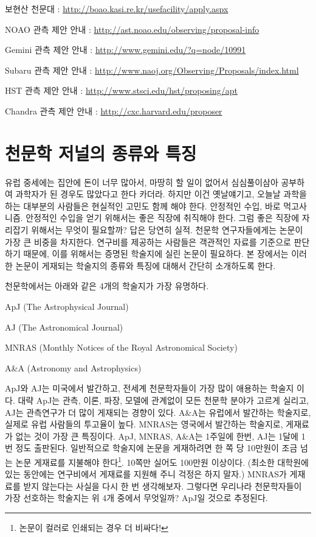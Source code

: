 \begin{packed_item}
\item 보현산 천문대 : \url{http://boao.kasi.re.kr/usefacility/apply.aspx}
\item NOAO 관측 제안 안내 : \url{http://ast.noao.edu/observing/proposal-info}
\item Gemini 관측 제안 안내 : \url{http://www.gemini.edu/?q=node/10991}
\item Subaru 관측 제안 안내 : \url{http://www.naoj.org/Observing/Proposals/index.html}
\item HST 관측 제안 안내 : \url{http://www.stsci.edu/hst/proposing/apt}
\item Chandra 관측 제안 안내 : \url{http://cxc.harvard.edu/proposer}
\end{packed_item}

\section{천문학 저널의 종류와 특징}
유럽 중세에는 집안에 돈이 너무 많아서, 마땅히 할 일이 없어서 심심풀이삼아
공부하여 과학자가 된 경우도 많았다고 한다 카더라. 하지만 이건 옛날얘기고, 오늘날
과학을 하는 대부분의 사람들은 현실적인 고민도 함께 해야 한다. 안정적인 수입, 바로
먹고사니즘. 안정적인 수입을 얻기 위해서는 좋은 직장에 취직해야 한다. 그럼 좋은
직장에 자리잡기 위해서는 무엇이 필요할까? 답은 당연히 실적. 천문학 연구자들에게는
논문이 가장 큰 비중을 차지한다. 연구비를 제공하는 사람들은 객관적인 자료를
기준으로 판단하기 때문에, 이를 위해서는 증명된 학술지에 실린 논문이 필요하다. 본
장에서는 이러한 논문이 게재되는 학술지의 종류와 특징에 대해서 간단히 소개하도록
한다.

천문학에서는 아래와 같은 4개의 학술지가 가장 유명하다.
\begin{packed_item}
\item ApJ         (The Astrophysical Journal)
\item AJ          (The Astronomical Journal)
\item MNRAS   (Monthly Notices of the Royal Astronomical Society)
\item A\&A       (Astronomy and Astrophysics)
\end{packed_item}
ApJ와 AJ는 미국에서 발간하고, 전세계 천문학자들이 가장 많이 애용하는 학술지
이다. 대략 ApJ는 관측, 이론, 파장, 모델에 관계없이 모든 천문학 분야가 고르게
실리고, AJ는 관측연구가 더 많이 게재되는 경향이 있다. A\&A는 유럽에서 발간하는
학술지로, 실제로 유럽 사람들의 투고율이 높다. MNRAS는 영국에서 발간하는
학술지로, 게재료가 없는 것이 가장 큰 특징이다. ApJ, MNRAS, A\&A는 1주일에 한번,
AJ는 1달에 1번 정도 출판된다. 일반적으로 학술지에 논문을 게재하려면 한 쪽 당
10만원이 조금 넘는 논문 게재료를 지불해야 한다\footnote{논문이 컬러로 인쇄되는
  경우 더 비싸다!}. 10쪽만 실어도 100만원 이상이다. (최소한 대학원에 있는
동안에는 연구비에서 게재료를 지원해 주니 걱정은 하지 말자.) MNRAS가 게재료를 받지
않는다는 사실을 다시 한 번 생각해보자. 그렇다면 우리나라 천문학자들이 가장
선호하는 학술지는 위 4개 중에서 무엇일까? ApJ일 것으로 추정된다.

